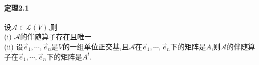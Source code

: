 \documentclass{ctexart}
\begin{document}
\paragraph{定理2.1}
设$\mathcal{A} \in \mathcal{L}(V)$,则\\
(i) $\mathcal{A}$的伴随算子存在且唯一\\
(ii) 设$\vec{e}_{1},\cdots,\vec{e}_{n}$是$V$的一组单位正交基,且$\mathcal{A}$在$\vec{e}_{1},\cdots,\vec{e}_{n}$下的矩阵是$A$,则$\mathcal{A}$的伴随算子在$\vec{e}_{1},\cdots,\vec{e}_{n}$下的矩阵是$A^{t}$.
\end{document}
